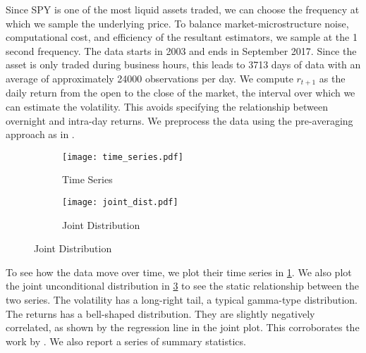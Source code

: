 Since SPY is one of the most liquid assets traded, we can choose the frequency at which we sample the underlying price. To balance market-microstructure noise, computational cost, and efficiency of the resultant estimators, we sample at the \num{1} second frequency. The data starts in 2003 and ends in September 2017. Since the asset is only traded during business hours, this leads to \num{3713} days of data with an average of approximately \num{24000} observations per day. We compute $r_{t+1}$ as the daily return from the open to the close of the market, the interval over which we can estimate the volatility. This avoids specifying the relationship between overnight and intra-day returns. We preprocess the data using the pre-averaging approach as in \textcites{podolskij2009bipower, aitsahalia2012testing}. 


\begin{figure}[htb]

  \centering
  \caption{S\&P 500 Volatility and Log-Return}


  \begin{subfigure}[t]{.54\textwidth}
    \label{risk_fig:spy_dynamics}
    \caption{Time Series}
    \texttt{[image: time\_series.pdf]}
  \end{subfigure}%
%
  \hfill
%
  \begin{subfigure}[t]{.44\textwidth}
    \label{risk_fig:spy_static}
    \caption{Joint Distribution}
    \texttt{[image: joint\_dist.pdf]}
  \end{subfigure}
\end{figure}


To see how the data move over time, we plot their time series in  \cref{risk_fig:spy_dynamics}.  We also plot the joint unconditional distribution in \cref{risk_fig:spy_static} to see the static relationship between the two series. The volatility has a long-right tail, a typical gamma-type distribution. The returns has a bell-shaped distribution. They are slightly negatively correlated, as shown by the regression line in the joint plot. This corroborates the work by \textcites{bandi2012timevarying, aitsahalia2013leverage}. We also report a series of summary statistics.

